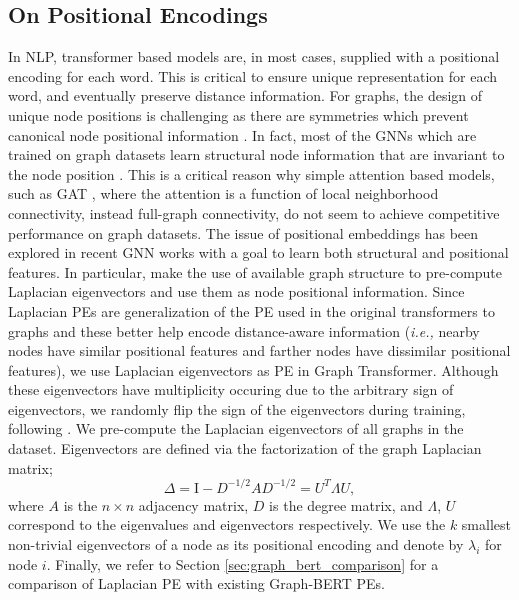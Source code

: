 \documentclass[letterpaper]{article} %
\begin{document}
\subsection{On Positional Encodings}
\label{sec:on_positional_encodings}
In NLP, transformer based models are, in most cases, supplied with a positional encoding for each word. This is critical to ensure unique representation for each word, and eventually preserve distance information. For graphs, the design of unique node positions is challenging as there are symmetries which prevent canonical node positional information \cite{murphy2019relational}. In fact, most of the GNNs which are trained on graph datasets learn structural node information that are invariant to the node position \cite{srinivasan2019equivalence}. This is a critical reason why simple attention based models, such as GAT \cite{velickovic2018graph}, where the attention is a function of local neighborhood connectivity, instead full-graph connectivity, do not seem to achieve competitive performance on graph datasets. The issue of positional embeddings has been explored in recent GNN works \cite{murphy2019relational, you2019position, srinivasan2019equivalence, dwivedi2020benchmarking, li2020distance} with a goal to learn both structural and positional features. In particular, \citet{dwivedi2020benchmarking} make the use of available graph structure to pre-compute Laplacian eigenvectors \cite{belkin2003laplacian} and use them as node positional information. 
Since Laplacian PEs are generalization of the PE used in the original transformers \cite{vaswani2017attention} to graphs and these better help encode distance-aware information (\textit{i.e.,} nearby nodes have similar positional features and farther nodes have dissimilar positional features), we use Laplacian eigenvectors as PE in Graph Transformer. Although these eigenvectors have multiplicity occuring due to the arbitrary sign of eigenvectors, we randomly flip the sign of the eigenvectors during training, following \citet{dwivedi2020benchmarking}.%
We pre-compute the Laplacian eigenvectors of all graphs in the dataset. Eigenvectors are defined via the factorization of the graph Laplacian matrix;
\begin{equation}
\Delta=\textrm{I}-D^{-1/2}AD^{-1/2}=U^T\Lambda U,
\label{eigenvec}
\end{equation}
where $A$ is the $n\times n$  adjacency matrix, $D$ is the degree matrix, and $\Lambda$, $U$ correspond to the eigenvalues and eigenvectors respectively. We use the $k$ smallest non-trivial eigenvectors of a node as its positional encoding and denote by ${\lambda}_i$ for node $i$. 
Finally, we refer to Section \ref{sec:graph_bert_comparison} for a comparison of Laplacian PE with existing Graph-BERT PEs.
\end{document}
